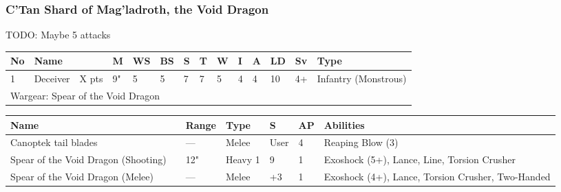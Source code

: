 \newpage
\subsubsection{C'Tan Shard of Mag'ladroth, the Void Dragon}
TODO: Maybe 5 attacks

\noindent
\begin{tabular}{||m{10pt} m{95pt} m{30pt} m{11pt} m{11pt} m{11pt} m{11pt} m{11pt} m{11pt} m{11pt} m{11pt} m{11pt} m{11pt} m{125pt}||}
\hline
No & Name & & M & WS & BS & S & T & W & I & A & LD & Sv & Type \\
\hline
1 & Deceiver & X pts & 9" & 5 & 5 & 7 & 7 & 5 & 4 & 4 & 10 & 4+ & Infantry (Monstrous)\\
\hline
\hline
\multicolumn{14}{||Z{532 pt}||}{Wargear: Spear of the Void Dragon}\\
\hline
\end{tabular}

\noindent
\begin{tabular}{||m{140pt} m{0pt} m{31pt} m{55pt} m{12pt} m{12pt} m{210pt}||}
\hline
Name & & Range & Type & S & AP & Abilities \\
\hline
Canoptek tail blades & & — & Melee & User & 4 & Reaping Blow (3) \\
Spear of the Void Dragon (Shooting) &  & 12" & Heavy 1 & 9 & 1 & Exoshock (5+), Lance, Line, Torsion Crusher \\
Spear of the Void Dragon (Melee) &  & — & Melee & +3 & 1 & Exoshock (4+), Lance, Torsion Crusher, Two-Handed \\
\hline
\end{tabular}

